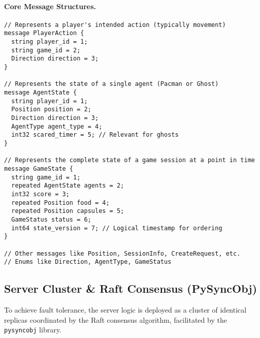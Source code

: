 \documentclass[11pt]{article}
\begin{document}
\paragraph{Core Message Structures.}
\begin{lstlisting}[caption=Key Messages from \texttt{pacman.proto}]
// Represents a player's intended action (typically movement)
message PlayerAction {
  string player_id = 1;
  string game_id = 2;
  Direction direction = 3;
}

// Represents the state of a single agent (Pacman or Ghost)
message AgentState {
  string player_id = 1;
  Position position = 2;
  Direction direction = 3;
  AgentType agent_type = 4;
  int32 scared_timer = 5; // Relevant for ghosts
}

// Represents the complete state of a game session at a point in time
message GameState {
  string game_id = 1;
  repeated AgentState agents = 2;
  int32 score = 3;
  repeated Position food = 4;
  repeated Position capsules = 5;
  GameStatus status = 6;
  int64 state_version = 7; // Logical timestamp for ordering
}

// Other messages like Position, SessionInfo, CreateRequest, etc.
// Enums like Direction, AgentType, GameStatus
\end{lstlisting}

\subsection{Server Cluster \& Raft Consensus (PySyncObj)}
To achieve fault tolerance, the server logic is deployed as a cluster of identical replicas coordinated by the Raft consensus algorithm, facilitated by the \texttt{pysyncobj} library.
\end{document}
